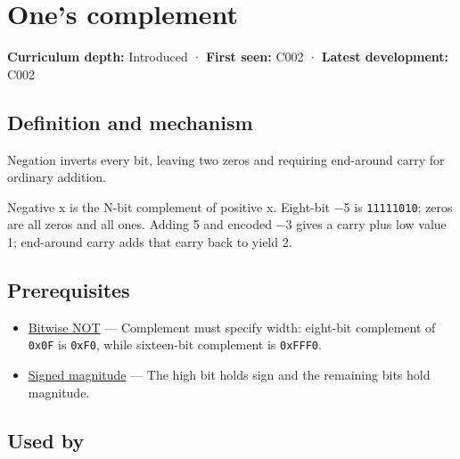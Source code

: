 \hypertarget{appendix-03c678cd40b3}{}\label{referencestart:appendix-03c678cd40b3}
\section{One's complement}\label{appendix-03c678cd40b3-ones-complement}

\hypertarget{appendix-03c678cd40b3-ones-complement}{}

\textbf{Curriculum depth:} Introduced · \textbf{First seen:} C002 · \textbf{Latest development:} C002

\begin{allmightroledefinition}

\subsection{Definition and mechanism}\label{appendix-03c678cd40b3-definition-and-mechanism}

\hypertarget{appendix-03c678cd40b3-definition-and-mechanism}{}

Negation inverts every bit, leaving two zeros and requiring end-around carry for ordinary addition.

\end{allmightroledefinition}

Negative x is the N-bit complement of positive x. Eight-bit −5 is \texttt{11111010}; zeros are all zeros and all ones. Adding 5 and encoded −3 gives a carry plus low value 1; end-around carry adds that carry back to yield 2.

\subsection{Prerequisites}\label{appendix-03c678cd40b3-prerequisites}

\hypertarget{appendix-03c678cd40b3-prerequisites}{}

\begin{itemize}
\tightlist
\item
  \hyperref[appendix-8f38927cfc54]{Bitwise NOT} --- Complement must specify width: eight-bit complement of \texttt{0x0F} is \texttt{0xF0}, while sixteen-bit complement is \texttt{0xFFF0}.
\item
  \hyperref[appendix-ce20506c8532]{Signed magnitude} --- The high bit holds sign and the remaining bits hold magnitude.
\end{itemize}

\subsection{Used by}\label{appendix-03c678cd40b3-used-by}


